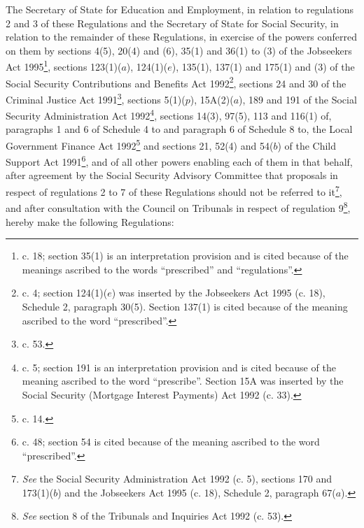 \documentclass[12pt,a4paper]{article}
\title{\regstitle}
\author{S.I. 1997 No. 827}
\date{Made 13th March 1997\\Laid before Parliament 17th March 1997\\Coming into force 7th April 1997}
\begin{document}
\maketitle

\noindent
The Secretary of State for Education and Employment, in relation to regulations 2 and 3 of these Regulations and the Secretary of State for Social Security, in relation to the remainder of these Regulations, in exercise of the powers conferred on them by sections 4(5), 20(4) and (6), 35(1) and 36(1) to (3) of the Jobseekers Act 1995\footnote{ c. 18; section 35(1) is an interpretation provision and is cited because of the meanings ascribed to the words “prescribed” and “regulations”.}, sections 123(1)($a$), 124(1)($e$), 135(1), 137(1) and 175(1) and (3) of the Social Security Contributions and Benefits Act 1992\footnote{ c. 4; section 124(1)($e$) was inserted by the Jobseekers Act 1995 (c. 18), Schedule 2, paragraph 30(5). Section 137(1) is cited because of the meaning ascribed to the word “prescribed”.}, sections 24 and 30 of the Criminal Justice Act 1991\footnote{ c. 53.}, sections 5(1)($p$), 15A(2)($a$), 189 and 191 of the Social Security Administration Act 1992\footnote{ c. 5; section 191 is an interpretation provision and is cited because of the meaning ascribed to the word “prescribe”. Section 15A was inserted by the Social Security (Mortgage Interest Payments) Act 1992 (c. 33).}, sections 14(3), 97(5), 113 and 116(1) of, paragraphs 1 and 6 of Schedule 4 to and paragraph 6 of Schedule 8 to, the Local Government Finance Act 1992\footnote{ c. 14.} and sections 21, 52(4) and 54($b$) of the Child Support Act 1991\footnote{ c. 48; section 54 is cited because of the meaning ascribed to the word “prescribed”.}, and of all other powers enabling each of them in that behalf, after agreement by the Social Security Advisory Committee that proposals in respect of regulations 2 to 7 of these Regulations should not be referred to it\footnote{\frenchspacing \emph{See} the Social Security Administration Act 1992 (c. 5), sections 170 and 173(1)($b$) and the Jobseekers Act 1995 (c. 18), Schedule 2, paragraph 67($a$).}, and after consultation with the Council on Tribunals in respect of regulation 9\footnote{\frenchspacing \emph{See} section 8 of the Tribunals and Inquiries Act 1992 (c. 53).}, hereby make the following Regulations:

{\sloppy

\tableofcontents

}
\end{document}

